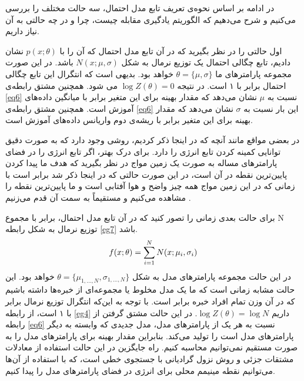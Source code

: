 در ادامه بر اساس نحوه‌ی تعریف تابع مدل احتمال، سه‌ حالت مختلف را بررسی‌ می‌‌کنیم و شرح می‌‌دهیم که الگوریتم یادگیری مقابله چیست، چرا و در چه حالتی به آن نیاز داریم.

اول حالتی را در نظر بگیرید که در آن تابع مدل احتمال
 که آن را با
$p(x;\theta)$
نشان دادیم، تابع چگالی احتمال یک توزیع نرمال
 به شکل
$N(x;\mu,\sigma)$
باشد. در این صورت مجموعه پارامتر‌های ما
$\theta = \{\mu,\sigma\}$
خواهد بود. بدیهی‌ است که انتگرال این تابع چگالی احتمال برابر با ۱ است. در نتیجه
$\log Z(\theta)=0$
می‌ شود. همچنین مشتق رابطه‌ی
\ref{eq6}
نسبت به
$\mu$
نشان می‌‌دهد که مقدار بهینه برای این متغیر
برابر با میانگین داده‌های آموزش است. همچنین مشتق رابطه‌ی
\ref{eq6}
این بار نسبت به
$\sigma$
نشان می‌‌دهد که مقدار بهینه برای این متغیر برابر با ریشه‌ی دوم واریانس داده‌های آموزش است.

در بعضی‌ مواقع مانند آنچه که در اینجا ذکر کردیم، روشی‌ وجود دارد که به صورت دقیق توانایی کمینه کردن تابع انرژی را دارد. برای درک بهتر، اگر تابع انرژی را در فضای پارامتر‌های مساله به صورت یک زمین مواج
در نظر بگیرید که هدف ما پیدا کردن پایین‌ترین نقطه در آن است، در این  صورت حالتی که در اینجا ذکر شد برابر است با زمانی‌ که در این زمین مواج همه چیز واضح و هوا آفتابی است و ما پایین‌ترین نقطه را مشاهده می‌‌کنیم و مستقیماً به سمت آن قدم می‌‌زنیم
\cite{woodfordnotes}.

برای حالت بعدی زمانی‌ را تصور کنید که در آن تابع مدل احتمال، برابر با مجموع
N
توزیع نرمال به شکل رابطه
\ref{eg7}
باشد.
\begin{align}
\centering
	f(x;\theta)=\sum_{i=1}^N N(x;\mu_i,\sigma_i)
\label{eg7}
\end{align}
در این حالت مجموعه پارامترهای مدل به شکل
$\theta = \{\mu_{1,...,N},\sigma_{1,...,N} \}$ 
خواهد بود. این حالت مشابه زمانی‌ است که ما یک مدل مخلوط یا مجموعه‌ای از خبره‌ها 
داشته باشیم که در آن وزن تمام افراد خبره برابر است. با توجه به این‌که انتگرال توزیع نرمال برابر با ۱ است، از رابطه
\ref{eg4}
داریم
$\log Z(\theta) = \log N$.
 در این حالت مشتق گرفتن از رابطه
\ref{eq6}
نسبت به هر یک از پارامتر‌های مدل، مدل جدیدی که وابسته به دیگر پارامتر‌های مدل است را تولید می‌‌کند. بنابراین مقدار بهینه برای پارامتر‌های مدل را به صورت مستقیم نمی‌‌توانیم محاسبه کنیم. راه جایگزین در این حالت استفاده از معادلات مشتقات جزئی‌ 
و روش نزول گرادیانی
 با جستجوی خطی‌
  است، که با استفاده از آن‌ها می‌‌توانیم نقطه مینیمم محلی برای انرژی در فضای پارامتر‌های مدل را پیدا کنیم.

